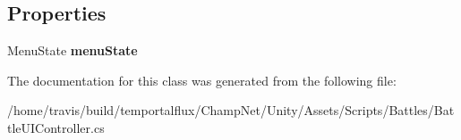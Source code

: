 \subsection*{Properties}
\begin{DoxyCompactItemize}
\item 
\hypertarget{class_battle_u_i_controller_a4f8584c7f4ebdeb9b29bf982dc8a5e5d}{Menu\-State {\bfseries menu\-State}}\label{class_battle_u_i_controller_a4f8584c7f4ebdeb9b29bf982dc8a5e5d}

\end{DoxyCompactItemize}


The documentation for this class was generated from the following file\-:\begin{DoxyCompactItemize}
\item 
/home/travis/build/temportalflux/\-Champ\-Net/\-Unity/\-Assets/\-Scripts/\-Battles/Battle\-U\-I\-Controller.\-cs\end{DoxyCompactItemize}
